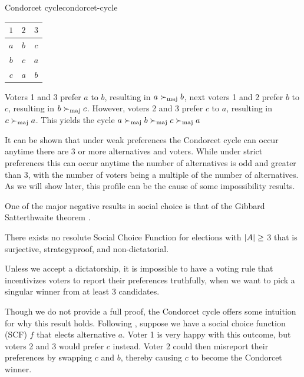 \begin{example}{Condorcet cycle}{condorcet-cycle}
	\begin{minipage}{0.15\linewidth}
		\begin{tabular}{ccc}
			\toprule
			$1$ & $2$ & $3$  \\
			\midrule
			$a$ & $b$ & $c $ \\
			$b$ & $c$ & $a $ \\
			$c$ & $a$ & $b $ \\
			\bottomrule
		\end{tabular}
	\end{minipage}
	\hspace{0.02\linewidth}
	\begin{minipage}{0.78\linewidth}
		Voters 1 and 3  prefer $a$ to $b$, resulting in $a \succ_{\textnormal{maj}} b$,
		next voters 1 and 2 prefer $b$ to $c$, resulting in $b \succ_{\textnormal{maj}}
			c$. However, voters 2 and 3 prefer $c$ to $a$, resulting in $c
			\succ_{\textnormal{maj}} a$. This yields the cycle $a \succ_{\textnormal{maj}} b \succ_{\textnormal{maj}} c
			\succ_{\textnormal{maj}} a$
	\end{minipage}
\end{example}

It can be shown that under weak preferences the Condorcet
cycle can occur anytime there are 3 or more alternatives and voters. While
under strict preferences this can occur anytime the number of alternatives is
odd and greater than 3, with the number of voters being a multiple of the
number of alternatives. As we will show later, this profile can be the cause of
some impossibility results.

One of the major negative results in social choice is that of the Gibbard
Satterthwaite theorem
\citep{gibbardManipulationVotingSchemes1973,satterthwaiteStrategyproofnessArrowsConditions1975}.

\begin{theorem}
	\label{thm:gs-thm}
	There exists no resolute Social Choice Function for elections with $|A| \geq$ 3 that is surjective, strategyproof, and non-dictatorial.
\end{theorem}

Unless we accept a dictatorship, it is impossible to have a voting
rule that incentivizes voters to report their preferences truthfully, when we
want to pick a singular winner from at least 3 candidates.

Though we do not provide a full proof, the Condorcet cycle offers some
intuition for why this result holds. Following ,
suppose we have a social choice function (SCF) $f$ that elects alternative $a$.
Voter 1 is very happy with this outcome, but voters 2 and 3 would prefer $c$
instead. Voter 2 could then misreport their preferences by swapping $c$ and
$b$, thereby causing $c$ to become the Condorcet winner.

